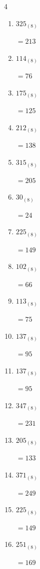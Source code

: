 \begin{multicols}{4}
\begin{enumerate}
        $=106$

  \item $325_{(8)}$

        $=213$

  \item $114_{(8)}$

        $=76$

  \item $175_{(8)}$

        $=125$

  \item $212_{(8)}$

        $=138$

  \item $315_{(8)}$

        $=205$

  \item $30_{(8)}$

        $=24$

\columnbreak %

  \item $225_{(8)}$

        $=149$

  \item $102_{(8)}$

        $=66$

  \item $113_{(8)}$

        $=75$

  \item $137_{(8)}$

        $=95$

  \item $137_{(8)}$

        $=95$

  \item $347_{(8)}$

        $=231$

  \item $205_{(8)}$

        $=133$

  \item $371_{(8)}$

        $=249$

  \item $225_{(8)}$

        $=149$

  \item $251_{(8)}$

        $=169$


\end{enumerate}
\end{multicols}
